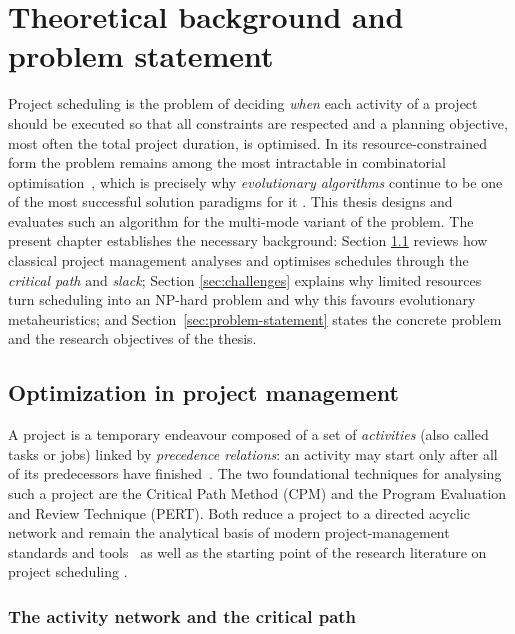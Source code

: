 \chapter{Theoretical background and problem statement}
\label{chap:theoretical-background}

Project scheduling is the problem of deciding \emph{when} each activity of a
project should be executed so that all constraints are respected and a planning
objective, most often the total project duration, is optimised. In its
resource-constrained form the problem remains among the most intractable in
combinatorial optimisation~\cite{blazewicz1983,hartmann2010survey}, which is
precisely why \emph{evolutionary algorithms} continue to be one of the most
successful solution paradigms for it \cite{kolisch2006,khajesaeedi2025review}.
This thesis designs and evaluates such an algorithm for the multi-mode variant
of the problem. The present chapter establishes the necessary background:
Section \ref{sec:opt-pm} reviews how classical project management analyses and
optimises schedules through the \emph{critical path} and \emph{slack};
Section \ref{sec:challenges} explains why limited resources turn scheduling into
an NP-hard problem and why this favours evolutionary metaheuristics; and
Section~\ref{sec:problem-statement} states the concrete problem and the research
objectives of the thesis.

\section{Optimization in project management}
\label{sec:opt-pm}

A project is a temporary endeavour composed of a set of \emph{activities} (also
called tasks or jobs) linked by \emph{precedence relations}: an activity may
start only after all of its predecessors have finished~\cite{pmbok2021}. The two
foundational techniques for analysing such a project are the Critical Path
Method (CPM) and the Program Evaluation and Review Technique (PERT). Both
reduce a project to a directed acyclic
network and remain the analytical basis of modern project-management standards
and tools~\cite{pmbok2021} as well as the starting point of the research
literature on project scheduling \cite{demeulemeester2002}.

\subsection{The activity network and the critical path}
\label{subsec:cpm}


